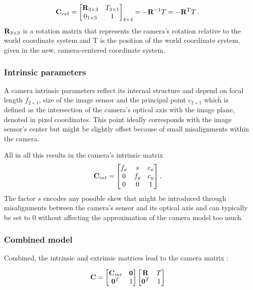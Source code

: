 			\begin{equation}
			\mathbf{C}_{ext} = \begin{bmatrix}
						\mathbf{R}_{3\times 3} & T_{3\times 1}\\
						0_{1\times 3} & 1
						\end{bmatrix}_{4\times 4} = -\mathbf{R}^{-1}T = -\mathbf{R}^TT \, . 
			\end{equation}
			$\mathbf{R}_{3\times 3}$ is a rotation matrix that represents the camera's rotation relative to the world coordinate system and T is the position of the world coordinate system, given in the new, camera-centered coordinate system. 
	
		\subsubsection{Intrinsic parameters}
			A camera intrinsic parameters reflect its internal structure and depend on focal length $f_{2\times 1}$, size of the image sensor and the principal point $c_{2\times1}$ which is defined as the intersection of the camera's optical axis with the image plane, denoted in pixel coordinates. This point ideally corresponds with the image sensor's center but might be slightly offset because of small misalignments within the camera.
			
			All in all this results in the camera's intrinsic matrix
			\begin{equation}
			\mathbf{C}_{int} = \begin{bmatrix}
				f_x & s & c_x  \\
				0 & f_y & c_y \\
				0 & 0 & 1 
				\end{bmatrix}.
			\end{equation}
			The factor $s$ encodes any possible skew that might be introduced through misalignments between the camera's sensor and its optical axis and can typically be set to $0$ without affecting the approximation of the camera model too much.
		
		\subsubsection{Combined model}
			Combined, the intrinsic and extrinsic matrices lead to the camera matrix \cite{Szeliski2010}:
			
			\begin{equation}
			\mathbf{C} = \begin{bmatrix}\mathbf{C}_{int} & \mathbf{0}\\\mathbf{0}^T & 1\end{bmatrix}
			\begin{bmatrix}\mathbf{R} & T\\\mathbf{0}^T & 1\end{bmatrix}
			\end{equation}
			
